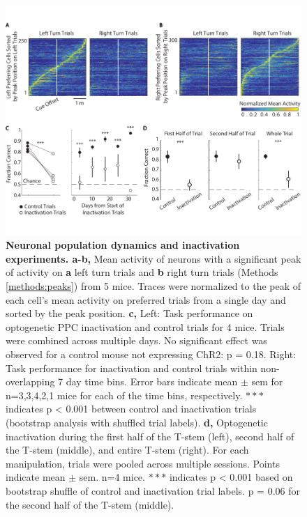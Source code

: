 \begin{figure}
\includegraphics[width=\textwidth]{figures/1_seq_inact.pdf}
\caption[Neuronal population dynamics and inactivation experiments.]{\textbf{Neuronal population dynamics and inactivation experiments. a-b,} Mean activity of neurons with a significant peak of activity on \textbf{a} left turn trials and \textbf{b} right turn trials (Methods \ref{methods:peaks}) from 5 mice. Traces were normalized to the peak of each cell's mean activity on preferred trials from a single day and sorted by the peak position. 
%
\textbf{c,} Left: Task performance on optogenetic PPC inactivation and control trials for 4 mice. Trials were combined across multiple days. No significant effect was observed for a control mouse not expressing ChR2: p = 0.18. Right: Task performance for inactivation and control trials within non-overlapping 7 day time bins. Error bars indicate mean $\pm$ sem for n=3,3,4,2,1 mice for each of the time bins, respectively. $***$ indicates p < 0.001 between control and inactivation trials (bootstrap analysis with shuffled trial labels).
%
\textbf{d,} Optogenetic inactivation during the first half of the T-stem (left), second half of the T-stem (middle), and entire T-stem (right). For each manipulation, trials were pooled across multiple sessions. Points indicate mean $\pm$ sem. n=4 mice. $***$ indicates p < 0.001 based on bootstrap shuffle of control and inactivation trial labels. p = 0.06 for the second half of the T-stem (middle).
\label{fig:1_seq_inact}}
\end{figure}

\bigskip


